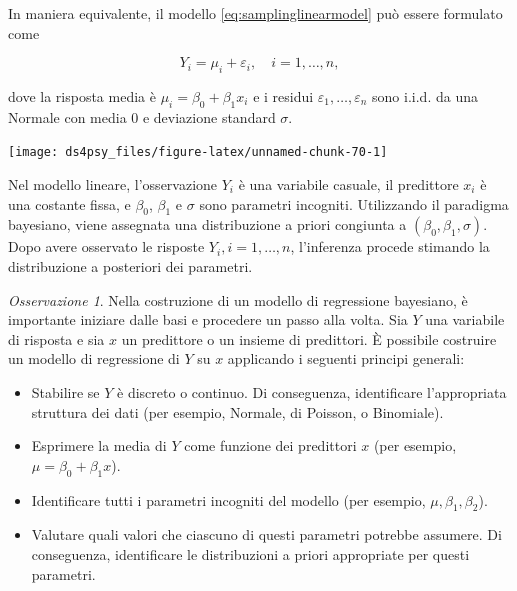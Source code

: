 \documentclass[
  11pt,
]{krantz}
\theoremstyle{definition}
\theoremstyle{definition}
\theoremstyle{definition}
\theoremstyle{definition}
\theoremstyle{remark}
\newtheorem*{remark}{Osservazione}
\begin{document}
In maniera equivalente, il modello \eqref{eq:samplinglinearmodel} può essere formulato come

\begin{equation}
Y_i = \mu_i + \varepsilon_i, \quad i = 1, \dots, n,
\label{eq:samplinglinearmodel2}
\end{equation}

dove la risposta media è \(\mu_i = \beta_0 + \beta_ 1 x_i\) e i residui \(\varepsilon_1, \dots, \varepsilon_n\) sono i.i.d. da una Normale con media 0 e deviazione standard \(\sigma\).

\begin{center}\texttt{[image: ds4psy\_files/figure-latex/unnamed-chunk-70-1]} \end{center}

Nel modello lineare, l'osservazione \(Y_i\) è una variabile casuale, il predittore \(x_i\) è una costante fissa, e \(\beta_0\), \(\beta_1\) e \(\sigma\) sono parametri incogniti. Utilizzando il paradigma bayesiano, viene assegnata una distribuzione a priori congiunta a \((\beta_0, \beta_1, \sigma)\). Dopo avere osservato le risposte \(Y_i, i = 1, \dots, n\), l'inferenza procede stimando la distribuzione a posteriori dei parametri.

\begin{remark}

Nella costruzione di un modello di regressione bayesiano, è importante iniziare dalle basi e procedere un passo alla volta. Sia \(Y\) una variabile di risposta e sia \(x\) un predittore o un insieme di predittori. È possibile costruire un modello di regressione di \(Y\) su \(x\) applicando i seguenti principi generali:

\begin{itemize}
\item
  Stabilire se \(Y\) è discreto o continuo. Di conseguenza, identificare l'appropriata struttura dei dati (per esempio, Normale, di Poisson, o Binomiale).
\item
  Esprimere la media di \(Y\) come funzione dei predittori \(x\) (per esempio, \(\mu = \beta_0 + \beta_1 x\)).
\item
  Identificare tutti i parametri incogniti del modello (per esempio, \(\mu, \beta_1, \beta_2\)).
\item
  Valutare quali valori che ciascuno di questi parametri potrebbe assumere. Di conseguenza, identificare le distribuzioni a priori appropriate per questi parametri.
\end{itemize}

\end{remark}
\end{document}
